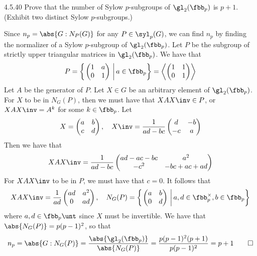 \begin{exercise}{4.5.40}
	Prove that the number of Sylow $p$-subgroups of $\gl_2(\fbb_p)$ is $p + 1$. (Exhibit two distinct Sylow $p$-subgroups.)
\end{exercise}

\begin{sol}
	Since $n_p = \abs{G : N_P(G)}$ for any $P \in \syl_p(G)$, we can find $n_p$ by finding the normalizer of a Sylow $p$-subgroup of $\gl_2(\fbb_p)$.
	Let $P$ be the subgroup of strictly upper triangular matrices in $\gl_2(\fbb_p)$.
	We have that
	\[
		P = 
		\left\{\left.
			\begin{pmatrix}
				1 & a \\
				0 & 1
			\end{pmatrix}~\right| a \in \fbb_p
		\right\}
		= 
		\left\langle
			\begin{pmatrix}
				1 & 1 \\
				0 & 1
			\end{pmatrix}
		\right\rangle
	\]
	Let $A$ be the generator of $P$.
	Let $X \in G$ be an arbitrary element of $\gl_2(\fbb_p)$.
	For $X$ to be in $N_G(P)$, then we must have that $XAX\inv \in P$, or $XAX\inv = A^k$ for some $k \in \fbb_p$.
	Let
	\[
		X =
		\begin{pmatrix}
			a & b \\
			c & d
		\end{pmatrix}, \quad
		X\inv =
		\frac{1}{ad - bc}
		\begin{pmatrix}
			d & -b \\
			-c & a
		\end{pmatrix}
	\]
	Then we have that
	\[
		XAX\inv =
		\frac{1}{ad - bc}
		\begin{pmatrix}
			ad - ac - bc & a^2 \\
			-c^2 & -bc + ac + ad
		\end{pmatrix}
	\]
	For $XAX\inv$ to be in $P$, we must have that $c = 0$.
	It follows that
	\[
		XAX\inv = 
		\frac{1}{ad}
		\begin{pmatrix}
			ad & a^2 \\
			0 & ad
		\end{pmatrix}, \quad
		N_G(P) = 
		\left\{\left.
			\begin{pmatrix}
				a & b \\
				0 & d
			\end{pmatrix}~\right| a, d \in \fbb_p^\times, b \in \fbb_p
		\right\}
	\]
	where $a, d \in \fbb_p\unt$ since $X$ must be invertible.
	We have that $\abs{N_G(P)} = p(p - 1)^2$, so that
	\[
		n_p = \abs{G : N_G(P)} = \frac{\abs{\gl_2(\fbb_p)}}{\abs{N_G(P)}} = \frac{p(p - 1)^2(p + 1)}{p(p - 1)^2} = p + 1 \qedhere
	\]
\end{sol}

